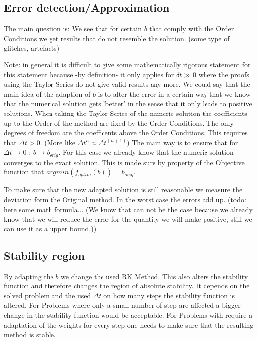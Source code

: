 \documentclass{article}
\begin{document}
\subsection{Error detection/Approximation}
The main question is: We see that for certain $b$ that comply with the Order Conditions we get results that do not resemble the solution. (some type of glitches, artefacts)

Note: in general it is difficult to give some mathematically rigorous statement for this statement because -by definition- it only applies for $\delta t \gg 0$ where the proofs using the Taylor Series do not give valid results any more. We could say that the main idea of the adaption of $b$ is to alter the error in a certain way that we know that the numerical solution gets 'better' in the sense that it only leads to positive solutions. 
When taking the Taylor Series of the numeric solution the coefficients up to the Order of the method are fixed by the Order Conditions. The only degrees of freedom are the coefficents above the Order Conditions. This requires that $\Delta t > 0$. (More like $\Delta t^n \approx \Delta t^(n+1) $)
The main way is to ensure that for $\Delta t \to 0$ : $b \to b_{orig}$. For this case we already know that the numeric solution converges to the exact solution.  
This is made sure by property of the Objective function that $argmin(f_{optim}(b)) = b_{orig}$. 

To make sure that the new adapted solution is still reasonable we measure the deviation form the Original method. In the worst case the errors add up. (todo: here some math formula... (We know that can not be the case because we already know that we will reduce the error for the quantity we will make positive, still we can use it as a upper bound.))


\subsection{Stability region}

By adapting the $b$ we change the used RK Method. This also alters the stability function and therefore changes the region of absolute stability. 
It depends on the solved problem and the used $\Delta t$ on how many steps the stability function is altered. For Problems where only a small number of step are affected a bigger change in the stability function would be acceptable. For Problems with require a adaptation of the weights for every step one needs to make sure that the resulting method is stable.
\end{document}
